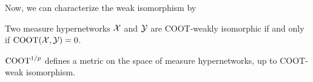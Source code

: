 Now, we can characterize the weak isomorphism by
\begin{proposition} \label{prop:coot_iso}
  Two measure hypernetworks $\mathcal X$ and $\mathcal Y$ are COOT-weakly isomorphic if and only if
  $\text{COOT}(\mathcal X, \mathcal Y) = 0$.
\end{proposition}
\begin{proposition} \label{prop:metric_prop}
  $\text{COOT}^{1/p}$ defines a metric on the space of measure hypernetworks, up to COOT-weak isomorphism.
\end{proposition}

